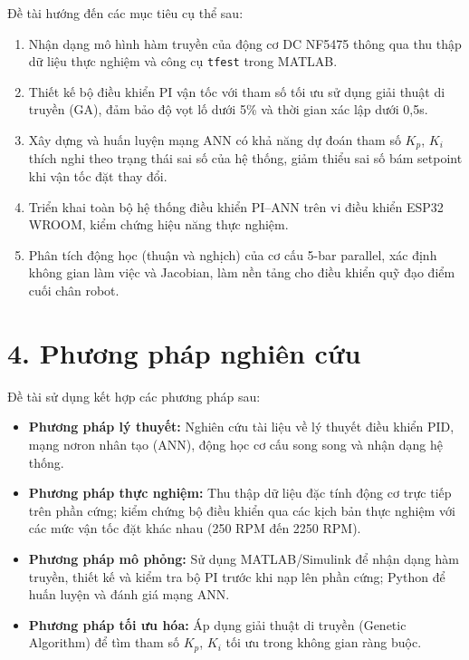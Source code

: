Đề tài hướng đến các mục tiêu cụ thể sau:

\begin{enumerate}[leftmargin=1.5cm, label=\arabic*.]
    \item Nhận dạng mô hình hàm truyền của động cơ DC NF5475 thông qua thu thập
    dữ liệu thực nghiệm và công cụ \texttt{tfest} trong MATLAB.

    \item Thiết kế bộ điều khiển PI vận tốc với tham số tối ưu sử dụng giải thuật di
    truyền (GA), đảm bảo độ vọt lố dưới 5\% và thời gian xác lập dưới 0{,}5s.

    \item Xây dựng và huấn luyện mạng ANN có khả năng dự đoán tham số $K_p$, $K_i$
    thích nghi theo trạng thái sai số của hệ thống, giảm thiểu sai số bám setpoint khi
    vận tốc đặt thay đổi.

    \item Triển khai toàn bộ hệ thống điều khiển PI--ANN trên vi điều khiển ESP32
    WROOM, kiểm chứng hiệu năng thực nghiệm.

    \item Phân tích động học (thuận và nghịch) của cơ cấu 5-bar parallel, xác định
    không gian làm việc và Jacobian, làm nền tảng cho điều khiển quỹ đạo điểm cuối
    chân robot.
\end{enumerate}


\section*{4. Phương pháp nghiên cứu}

Đề tài sử dụng kết hợp các phương pháp sau:

\begin{itemize}[leftmargin=1.5cm]
    \item \textbf{Phương pháp lý thuyết:} Nghiên cứu tài liệu về lý thuyết điều khiển
    PID, mạng nơron nhân tạo (ANN), động học cơ cấu song song và nhận dạng hệ thống.

    \item \textbf{Phương pháp thực nghiệm:} Thu thập dữ liệu đặc tính động cơ trực
    tiếp trên phần cứng; kiểm chứng bộ điều khiển qua các kịch bản thực nghiệm với
    các mức vận tốc đặt khác nhau (250 RPM đến 2250 RPM).

    \item \textbf{Phương pháp mô phỏng:} Sử dụng MATLAB/Simulink để nhận dạng hàm
    truyền, thiết kế và kiểm tra bộ PI trước khi nạp lên phần cứng; Python để huấn
    luyện và đánh giá mạng ANN.

    \item \textbf{Phương pháp tối ưu hóa:} Áp dụng giải thuật di truyền (Genetic
    Algorithm) để tìm tham số $K_p$, $K_i$ tối ưu trong không gian ràng buộc.
\end{itemize}



